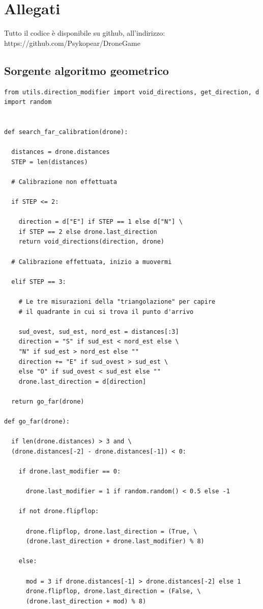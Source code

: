 \chapter{Allegati}
Tutto il codice è disponibile su github, all'indirizzo: \\https://github.com/Psykopear/DroneGame
\section{Sorgente algoritmo geometrico}
\begin{verbatim}
from utils.direction_modifier import void_directions, get_direction, d
import random


def search_far_calibration(drone):

  distances = drone.distances
  STEP = len(distances)

  # Calibrazione non effettuata

  if STEP <= 2:

    direction = d["E"] if STEP == 1 else d["N"] \
    if STEP == 2 else drone.last_direction
    return void_directions(direction, drone)

  # Calibrazione effettuata, inizio a muovermi

  elif STEP == 3:

    # Le tre misurazioni della "triangolazione" per capire
    # il quadrante in cui si trova il punto d'arrivo

    sud_ovest, sud_est, nord_est = distances[:3]
    direction = "S" if sud_est < nord_est else \
    "N" if sud_est > nord_est else ""
    direction += "E" if sud_ovest > sud_est \
    else "O" if sud_ovest < sud_est else ""
    drone.last_direction = d[direction]

  return go_far(drone) 

def go_far(drone):

  if len(drone.distances) > 3 and \
  (drone.distances[-2] - drone.distances[-1]) < 0:

    if drone.last_modifier == 0:

      drone.last_modifier = 1 if random.random() < 0.5 else -1

    if not drone.flipflop:

      drone.flipflop, drone.last_direction = (True, \
      (drone.last_direction + drone.last_modifier) % 8)

    else:

      mod = 3 if drone.distances[-1] > drone.distances[-2] else 1
      drone.flipflop, drone.last_direction = (False, \
      (drone.last_direction + mod) % 8)


\end{verbatim}
